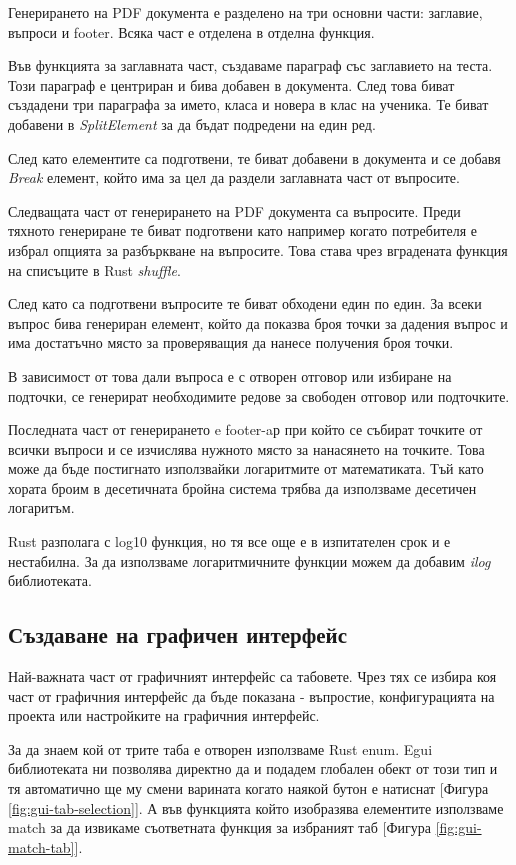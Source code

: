 Генерирането на PDF документа е разделено на три основни части: заглавие,
въпроси и footer. Всяка част е отделена в отделна функция.

Във функцията за заглавната част, създаваме параграф със заглавието на теста.
Този параграф е центриран и бива добавен в документа.
След това биват създадени три параграфа за името, класа и новера в клас на
ученика. Те биват добавени в \textit{SplitElement} за да бъдат подредени на
един ред.

След като елементите са подготвени, те биват добавени в документа и се добавя
\textit{Break} елемент, който има за цел да раздели заглавната част от
въпросите.

Следващата част от генерирането на PDF документа са въпросите. Преди тяхното
генериране те биват подготвени като например когато потребителя е избрал
опцията за разбъркване на въпросите. Това става чрез вградената функция на списъците в Rust \textit{shuffle}.

След като са подготвени въпросите те биват обходени един по един. За всеки въпрос
бива генериран елемент, който да показва броя точки за дадения въпрос и има
достатъчно място за проверяващия да нанесе получения броя точки.

В зависимост от това дали въпроса е с отворен отговор или избиране на подточки,
се генерират необходимите редове за свободен отговор или подточките.

Последната част от генерирането e footer-aр при който се събират точките от
всички въпроси и се изчислява нужното място за нанасянето на точките. Това може
да бъде постигнато използвайки логаритмите от математиката. Тъй като хората
броим в десетичната бройна система трябва да използваме десетичен логаритъм.

Rust разполага с log10 функция, но тя все още е в изпитателен срок и е нестабилна.
За да използваме логаритмичните функции можем да добавим \textit{ilog} библиотеката.
 
\subsection{Създаване на графичен интерфейс}
Най-важната част от графичният интерфейс са табовете. Чрез тях се избира коя
част от графичния интерфейс да бъде показана - въпростие, конфигурацията на
проекта или настройките на графичния интерфейс.

За да знаем кой от трите таба е отворен използваме Rust enum. Egui библиотеката
ни позволява директно да и подадем глобален обект от този тип и тя автоматично
ще му смени варината когато наякой бутон е натиснат [Фигура
\ref{fig:gui-tab-selection}]. А във функцията който изобразява елементите
използваме match за да извикаме съответната функция за избраният таб [Фигура
\ref{fig:gui-match-tab}].

